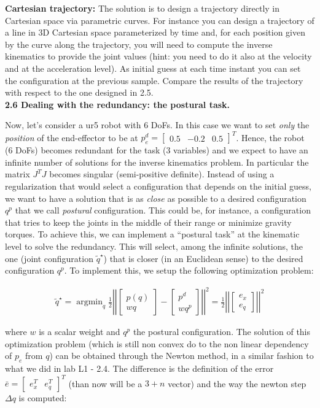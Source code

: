 \documentclass[11pt]{article}
\newcommand{\mat}[1]{\ensuremath{\begin{bmatrix}#1\end{bmatrix}}}	%
\DeclareMathOperator*{\argmin}{argmin}
\begin{document}
\textbf{Cartesian trajectory:} The solution is  to  design a trajectory directly in Cartesian space via parametric curves. For instance you can design a trajectory of a line in 3D Cartesian space parameterized by time and, for each position given by the curve along the trajectory, you will need to compute the inverse kinematics to provide the joint values (hint: you need to do it also at the velocity and at the acceleration level). As initial guess at each time instant you can set the configuration at the previous sample. Compare the results of the trajectory with respect to the one designed in 2.5.\\

\noindent\textbf{2.6 Dealing with the redundancy: the postural task.} 

Now, let's consider a ur5 robot with 6 DoFs. In this case we want to set \textit{only} the \textit{position} of the end-effector to be at $p^d_e =\mat{0.5 & -0.2 & 0.5}^T$. Hence, the robot (6 DoFs) becomes redundant for the task (3 variables) and we expect to have an  infinite number of solutions for the inverse kinematics problem. In particular the matrix $J^TJ$ becomes singular (semi-positive definite). Instead of using a regularization that would select a configuration that depends on the initial guess, we want to have a solution that is as  \textit{close} as possible to a desired configuration $q^p$ that we call \textit{postural} configuration. This could be, for instance, a configuration that tries to keep the joints in the middle of their range or minimize gravity torques. To achieve this,  we can implement a ``postural task'' at the kinematic level to solve the redundancy.
This will  select, among the infinite solutions, the one (joint configuration $\tilde{q}^\star$) that is closer (in an Euclidean sense) to the desired configuration $q^p$. 
To implement this, we setup the following optimization problem:

\begin{align*}
\tilde{q}^\star = \argmin_q \frac{1}{2} \left|\left| \mat{p(q) \\ w q } - \mat{p^d \\ w q^p }   \right|\right|^2 = \frac{1}{2} \left|\left| \mat{ e_x \\ e_q }   \right|\right|^2
\end{align*}

where $w$ is a scalar weight and $q^p$ the postural configuration. The solution of this optimization problem (which is still non convex do to the non linear dependency of $p_e$ from $q$) can be obtained through the Newton method, in a similar fashion to what we did in lab L1 - 2.4. The difference is the definition of the error $\bar{e} = \mat{e_x^T & e_q^T}^T$ (than now will be a $3+n$ vector) and the way the newton step $\Delta q$ is computed:
\end{document}
